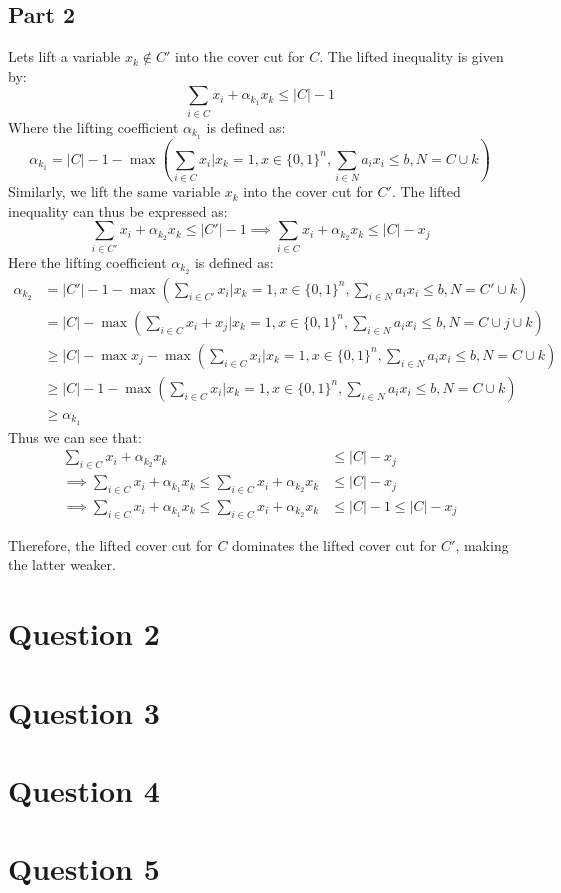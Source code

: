 \documentclass{article}
\begin{document}
    \subsection*{Part 2}
    Lets lift a variable $x_k\notin C'$ into the cover cut for $C$. The lifted inequality is given by:
    \[
        \sum_{i \in C} x_i + \alpha_{k_1} x_k \leq |C| - 1
    \]
    Where the lifting coefficient $\alpha_{k_1}$ is defined as:
    \[
        \alpha_{k_1} = |C| - 1 - \max \left(\sum_{i \in C} x_i | x_k = 1, x \in \{0,1\}^n, \sum_{i \in N} a_i x_i \leq b, N=C\cup{k}\right)
    \]
    Similarly, we lift the same variable $x_k$ into the cover cut for $C'$. The lifted inequality can thus be expressed as:
    \[
        \sum_{i \in C'} x_i + \alpha_{k_2} x_k \leq |C'| - 1  \implies \sum_{i \in C} x_i + \alpha_{k_2} x_k \leq |C| - x_j
    \]
    Here the lifting coefficient $\alpha_{k_2}$ is defined as:
    \begin{align*}
        \alpha_{k_2} &= |C'| - 1 - \max \left(\sum_{i \in C'} x_i | x_k = 1, x \in \{0,1\}^n, \sum_{i \in N} a_i x_i \leq b, N=C'\cup{k}\right) \\
        &= |C| -  \max \left(\sum_{i \in C} x_i + x_j | x_k = 1, x \in \{0,1\}^n, \sum_{i \in N} a_i x_i \leq b, N=C\cup{j}\cup{k}\right)\\
        &\geq |C| - \max{x_j} - \max \left(\sum_{i \in C} x_i | x_k = 1, x \in \{0,1\}^n, \sum_{i \in N} a_i x_i \leq b, N=C\cup{k}\right) \\
        &\geq |C| - 1 - \max \left(\sum_{i \in C} x_i | x_k = 1, x \in \{0,1\}^n, \sum_{i \in N} a_i x_i \leq b, N=C\cup{k}\right) \\
        &\geq \alpha_{k_1}
    \end{align*}
    Thus we can see that:
    \begin{align*}
        \sum_{i \in C} x_i + \alpha_{k_2} x_k &\leq |C| - x_j \\
        \implies \sum_{i \in C} x_i + \alpha_{k_1} x_k \leq \sum_{i \in C} x_i + \alpha_{k_2} x_k &\leq |C| - x_j\\
        \implies \sum_{i \in C} x_i + \alpha_{k_1} x_k \leq \sum_{i \in C} x_i + \alpha_{k_2} x_k &\leq |C| - 1 \leq |C| - x_j
    \end{align*}
    
    Therefore, the lifted cover cut for $C$ dominates the lifted cover cut for $C'$, making the latter weaker.
    
\section*{Question 2}
\section*{Question 3}
\section*{Question 4}

\section*{Question 5}
\end{document}
